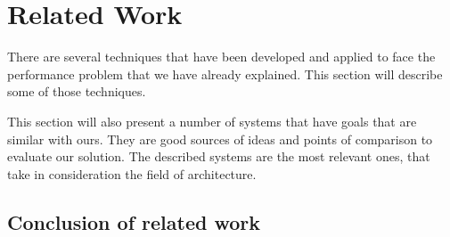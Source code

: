 
\chapter{Related Work}
\label{chapter:relatedwork}

There are several techniques that have been developed and applied to face the performance problem that we have already explained. This section will describe some of those techniques. 

This section will also present a number of systems that have goals that are similar with ours. They are good sources of ideas and points of comparison to evaluate our solution. The described systems are the most relevant ones, that take in consideration the field of architecture.










\section{Conclusion of related work} %
\label{sec:conclusion_of_related_work}

